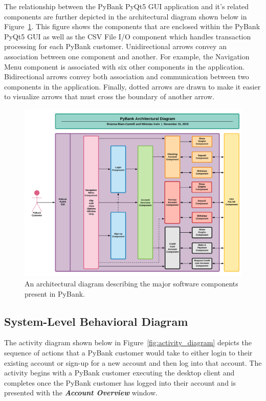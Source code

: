The relationship between the PyBank PyQt5 GUI application and it's related components are further depicted in the architectural diagram shown below in Figure~\ref{fig:architectural_diagram}. This figure shows the components that are enclosed within the PyBank PyQt5 GUI as well as the CSV File I/O component which handles transaction processing for each PyBank customer. Unidirectional arrows convey an association between one component and another. For example, the Navigation Menu component is associated with six other components in the application. Bidirectional arrows convey both association and communication between two components in the application. Finally, dotted arrows are drawn to make it easier to visualize arrows that must cross the boundary of another arrow.

\begin{figure}[H]
	\begin{centering}
	\includegraphics[width=1.00\linewidth, height=0.75\linewidth]{figures/Architectural_Diagram_PyBank.png}
	\caption{An architectural diagram describing the major software components present in PyBank.}
	\label{fig:architectural_diagram}
	\end{centering}
\end{figure}

\newpage

\subsection{System-Level Behavioral Diagram}
\label{sect:activity_diagram}

The activity diagram shown below in Figure~\ref{fig:activity_diagram} depicts the sequence of actions that a PyBank customer would take to either login to their existing account or sign-up for a new account and then log into that account. The activity begins with a PyBank customer executing the desktop client and completes once the PyBank customer has logged into their account and is presented with the \textbf{\textit{Account Overview}} window.

